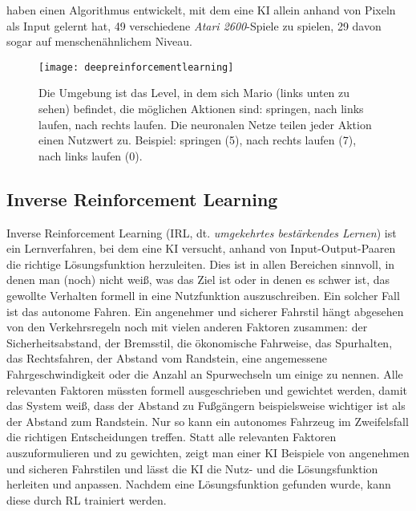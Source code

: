 \citeauthor{mnih_human-level_2015} haben einen Algorithmus entwickelt, mit dem eine KI allein anhand von Pixeln als Input gelernt hat, 49 verschiedene \emph{Atari 2600}-Spiele zu spielen, 29 davon sogar auf menschenähnlichem Niveau. 



\begin{figure}
  \texttt{[image: deepreinforcementlearning]}
  \caption{Die Umgebung ist das Level, in dem sich Mario (links unten zu sehen) befindet, die möglichen Aktionen sind: springen, nach links laufen, nach rechts laufen. Die neuronalen Netze teilen jeder Aktion einen Nutzwert zu. Beispiel: springen (5), nach rechts laufen (7), nach links laufen (0). }
  \label{deepreinforcementlearningimg}
\end{figure}

\subsection{Inverse Reinforcement Learning}
Inverse Reinforcement Learning (IRL, dt. \emph{umgekehrtes bestärkendes Lernen}) ist ein Lernverfahren, bei dem eine KI versucht, anhand von Input-Output-Paaren die richtige Lösungsfunktion herzuleiten. Dies ist in allen Bereichen sinnvoll, in denen man (noch) nicht weiß, was das Ziel ist oder in denen es schwer ist, das gewollte Verhalten formell in eine Nutzfunktion auszuschreiben. Ein solcher Fall ist das autonome Fahren. Ein angenehmer und sicherer Fahrstil hängt abgesehen von den Verkehrsregeln noch mit vielen anderen Faktoren zusammen: der Sicherheitsabstand, der Bremsstil, die ökonomische Fahrweise, das Spurhalten, das Rechtsfahren, der Abstand vom Randstein, eine angemessene Fahrgeschwindigkeit oder die Anzahl an Spurwechseln um einige zu nennen. Alle relevanten Faktoren müssten formell ausgeschrieben und gewichtet werden, damit das System weiß, dass der Abstand zu Fußgängern beispielsweise wichtiger ist als der Abstand zum Randstein. Nur so kann ein autonomes Fahrzeug im Zweifelsfall die richtigen Entscheidungen treffen. Statt alle relevanten Faktoren auszuformulieren und zu gewichten, zeigt man einer KI Beispiele von angenehmen und sicheren Fahrstilen und lässt die KI die Nutz- und die Lösungsfunktion herleiten und anpassen.  Nachdem eine Lösungsfunktion gefunden wurde, kann diese durch RL trainiert werden. 


